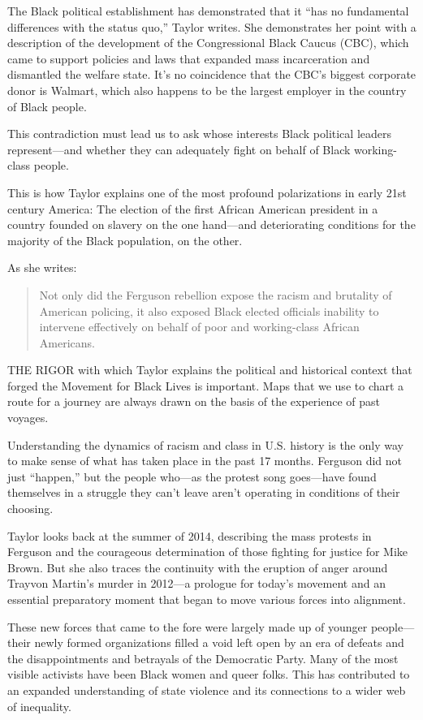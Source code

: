 The Black political establishment has demonstrated that it ``has no fundamental differences with the status quo,'' Taylor writes. She demonstrates her point with a description of the development of the Congressional Black Caucus (CBC), which came to support policies and laws that expanded mass incarceration and dismantled the welfare state. It's no coincidence that the CBC's biggest corporate donor is Walmart, which also happens to be the largest employer in the country of Black people.

This contradiction must lead us to ask whose interests Black political leaders represent---and whether they can adequately fight on behalf of Black working-class people.

This is how Taylor explains one of the most profound polarizations in early 21st century America: The election of the first African American president in a country founded on slavery on the one hand---and deteriorating conditions for the majority of the Black population, on the other.

As she writes:

\blockquote{Not only did the Ferguson rebellion expose the racism and brutality of American policing, it also exposed Black elected officials inability to intervene effectively on behalf of poor and working-class African Americans.}

\sectiondivider

THE RIGOR with which Taylor explains the political and historical context that forged the Movement for Black Lives is important. Maps that we use to chart a route for a journey are always drawn on the basis of the experience of past voyages.

Understanding the dynamics of racism and class in U.S. history is the only way to make sense of what has taken place in the past 17 months. Ferguson did not just ``happen,'' but the people who---as the protest song goes---have found themselves in a struggle they can't leave aren't operating in conditions of their choosing.

Taylor looks back at the summer of 2014, describing the mass protests in Ferguson and the courageous determination of those fighting for justice for Mike Brown. But she also traces the continuity with the eruption of anger around Trayvon Martin's murder in 2012---a prologue for today's movement and an essential preparatory moment that began to move various forces into alignment.

These new forces that came to the fore were largely made up of younger people---their newly formed organizations filled a void left open by an era of defeats and the disappointments and betrayals of the Democratic Party. Many of the most visible activists have been Black women and queer folks. This has contributed to an expanded understanding of state violence and its connections to a wider web of inequality.

